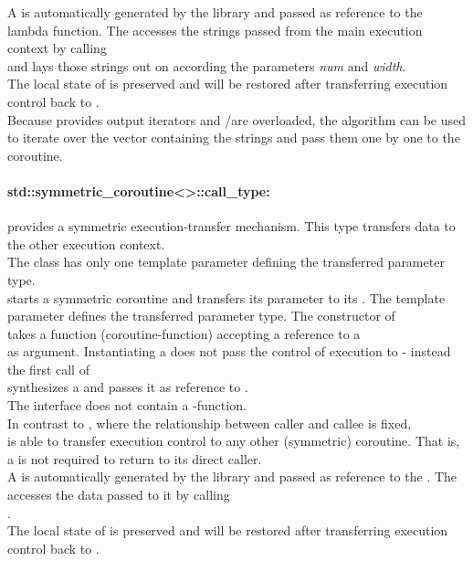 A \pullcoro is automatically generated by the library and passed as reference
to the lambda function. The \corofunction accesses the strings passed
from the main execution context by calling\\
\pullcoroget and lays those
strings out on  according the parameters \textit{num} and \textit{width}.\\
The local state of \corofunction is preserved and will be restored after
transferring execution control back to \corofunction.\\
Because \pushcoro provides output iterators and \bgin/\ed are overloaded, the
 algorithm can be used to iterate over the vector containing the
strings and pass them one by one to the coroutine.

\paragraph*{std::symmetric\_coroutine<>::call\_type:}
provides a symmetric execution-transfer mechanism. This type transfers data to
the other execution context.\\
The class has only one template parameter defining the transferred parameter
type.\\
\newline
\callcoro starts a symmetric coroutine and transfers its parameter to its
\corofunction. The template parameter defines the transferred parameter
type. The constructor of\\
\callcoro takes a function (coroutine-function) accepting a reference to a\\
\yieldcoro as argument. Instantiating a \callcoro does not pass the control of
execution to \corofunction{ }- instead the first call of\\
\callcoroop synthesizes a \yieldcoro and passes it as reference to \corofunction.\\
The \callcoro interface does not contain a \get-function.\\
\newline
In contrast to \acoro, where the relationship between caller and callee is
fixed,\\
\scoro is able to transfer execution control to any other (symmetric) coroutine.
That is, a \scoro is not required to return to its direct caller.\\
\newline
A \yieldcoro is automatically generated by the library and passed as reference
to the \corofunction. The \corofunction accesses the data passed to it by calling\\
\yieldcoroget.\\
The local state of \corofunction is preserved and will be restored after
transferring execution control back to \corofunction.\\

